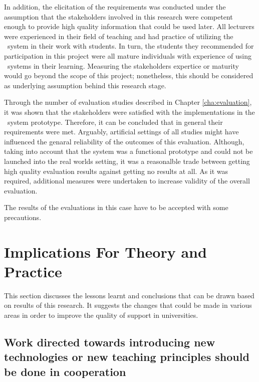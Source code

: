 In addition, the elicitation of the requirements was conducted under the
assumption that the stakeholders involved in this research were competent enough
to provide high quality information that could be used later. All lecturers were
experienced in their field of teaching and had practice of utilizing the
\ep~system in their work with students. In turn, the students they recommended
for participation in this project were all mature individuals with experience of
using \ep~systems in their learning. Measuring the stakeholders expertice or
maturity would go beyond the scope of this project; nonetheless, this should be
considered as underlying assumption behind this research stage.


Through the number of evaluation studies described in Chapter
\ref{cha:evaluation}, it was shown that the stakeholders were satisfied with the
implementations in the \ep~system prototype. Therefore, it can be concluded that
in general their requirements were met. Arguably, artificial settings of all
studies might have influenced the genaral reliability of the outcomes of this
evaluation. Although, taking into account that the system was a functional
prototype and could not be launched into the real worlds setting, it was a
reasonalble trade between getting high quality evaluation results against
getting no results at all. As it was required, additional measures were
undertaken to increase validity of the overall evaluation.

The results of the evaluations in this case have to be accepted with some
precautions.

\section{Implications For Theory and Practice}

This section discusses the lessons learnt and conclusions that can be drawn
based on results of this research. It suggests the changes that could be made in
various areas in order to improve the quality of \LLLs support in universities.

\subsection[Cooperation and Communication]{Work directed towards introducing
new technologies or new teaching principles should be done in cooperation}

